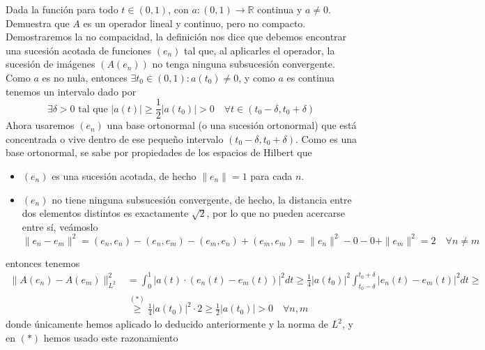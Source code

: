 \begin{ejercicio}
    Dada la función
    para todo $t \in (0, 1)$, con $a: (0, 1) \longrightarrow \mathbb{R}$ continua y $a \neq 0$. Demuestra que $A$ es un operador lineal y continuo, pero no compacto. \\

    \noindent
    Demostraremos la no compacidad, la definición nos dice que debemos encontrar una sucesión acotada de funciones $(e_n)$ tal que, al aplicarles el operador, la sucesión de imágenes $(A(e_n))$ no tenga ninguna subsucesión convergente. \\

    \noindent
    Como $a$ es no nula, entonces $\exists t_0 \in (0, 1) : a(t_0) \neq 0$, y como $a$ es continua tenemos un intervalo dado por 
    $$\exists\delta>0 \text{ tal que } |a(t)| \ge \frac{1}{2} |a(t_0)| > 0 \quad \forall t \in (t_0 - \delta, t_0 + \delta)$$
    Ahora usaremos $(e_n)$ una base ortonormal (o una sucesión ortonormal) que está concentrada o vive dentro de ese pequeño intervalo $(t_0 - \delta, t_0 + \delta)$. Como es una base ortonormal, se sabe por propiedades de los espacios de Hilbert que
    \begin{itemize}
        \item $(e_n)$ es una sucesión acotada, de hecho $\|e_n\| = 1$ para cada $n$.
        \item $(e_n)$ no tiene ninguna subsucesión convergente, de hecho, la distancia entre dos elementos distintos es exactamente $\sqrt{2}$, por lo que no pueden acercarse entre sí, veámoslo
        \begin{equation*}
            \|e_n - e_m\|^2 = (e_n, e_n) - (e_n, e_m) - (e_m, e_n) + (e_m, e_m)= \|e_n\|^2 -0-0+ \|e_m\|^2 = 2 \quad \forall n \neq m
        \end{equation*}
    \end{itemize}
    entonces tenemos 
    \begin{align*}
        \|A(e_n) - A(e_m)\|_{L^2}^2 &= \int_{0}^{1} |a(t) \cdot (e_n(t) - e_m(t))|^2 dt \geq \frac{1}{4} |a(t_0)|^2 \int_{t_0 - \delta}^{t_0 + \delta} |e_n(t) - e_m(t)|^2 dt \geq \\
        &\overset{(*)}{\geq} \frac{1}{4} |a(t_0)|^2 \cdot 2 \geq \frac{1}{2} |a(t_0)| > 0 \quad \forall n, m
    \end{align*}
    donde únicamente hemos aplicado lo deducido anteriormente y la norma de $L^2$, y en $(*)$ hemos usado este razonamiento
    \begin{align*}

\end{align*}
\end{ejercicio}
